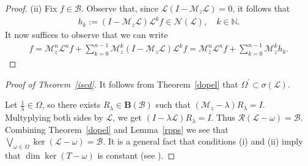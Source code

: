 \documentclass[reqno]{amsproc}
\numberwithin{equation}{section}
\theoremstyle{remark}
\newcommand*{\natu}{\mathbb{N}}
\newcommand*{\nul}{\mathscr{N}}
\newcommand*{\bou}{\boldsymbol{B}}
\theoremstyle{definition}
\newcommand{\lein}{\mathcal{L}}
\newcommand{\mul}{\mathcal{M}_z}
\newcommand{\bspace}{\mathcal{B}}
\newcommand*{\ran}{\mathscr{R}}
\begin{document}
\begin{proof}
 
(ii) Fix $f\in \bspace$. Observe that, since $\lein(I-\mul\lein)=0$, it follows that
\begin{align*}
    h_k:=(I-\mul\lein)\lein^kf\in \nul(\lein), \quad k\in \natu.
\end{align*} It now suffices to observe that we can write
    \begin{align*}
        f= \mul^n\lein^nf+\sum_{k=0}^{n-1}\mul^k(I-\mul\lein)\lein^kf=  \mul^n\lein^nf+\sum_{k=0}^{n-1}\mul^kh_k.
    \end{align*}
\end{proof}

\begin{proof}[Proof of Theorem~\ref{iscd}]
    It follows from Theorem~\ref{dopel} that $\varOmega^\prime\subset\sigma(\lein)$.

    Let $\frac{1}{\lambda}\in \varOmega$, so there exists $R_\lambda\in \bou(\bspace)$ such that $(\mul-\lambda)R_\lambda=I$. Multyplying both sides by $\lein$, we get $(I-\lambda\lein)R_\lambda=I$. Thus $\ran(\lein-\omega)=\bspace$.
    Combining Theorem~\ref{dopel} and Lemma~\ref{rpps} we see that $\bigvee_{\omega\in\varOmega}\ker(\lein-\omega)=\bspace$. It is a general fact that conditions (i) and (ii) imply that $\dim \ker (T-\omega)$ is constant (see \cite[p.~189]{CD78}).
\end{proof}
\end{document}
